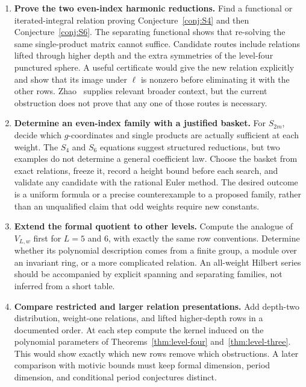 \begin{enumerate}[leftmargin=*,label=\textbf{R\arabic*.},itemsep=0.65em]

\item \textbf{Prove the two even-index harmonic reductions.}
Find a functional or iterated-integral relation proving
Conjecture~\ref{conj:S4} and then Conjecture~\ref{conj:S6}.
The separating functional shows that re-solving the same
single-product matrix cannot suffice. Candidate routes include
relations lifted through higher depth and the extra symmetries of
the level-four punctured sphere. A useful certificate would give
the new relation explicitly and show that its image under
\(\ell\) is nonzero before eliminating it with the other rows.
Zhao~\cite{Zhao} supplies relevant broader context, but the current
obstruction does not prove that any one of those routes is necessary.

\item \textbf{Determine an even-index family with a justified basket.}
For \(S_{2m}\), decide which \(g\)-coordinates and single products
are actually sufficient at each weight. The \(S_4\) and \(S_6\)
equations suggest structured reductions, but two examples do not
determine a general coefficient law. Choose the basket from exact
relations, freeze it, record a height bound before each search, and
validate any candidate with the rational Euler method.
The desired outcome is a uniform formula or a precise counterexample
to a proposed family, rather than an unqualified claim that odd
weights require new constants.

\item \textbf{Extend the formal quotient to other levels.}
Compute the analogue of \(V_{L,w}\) first for \(L=5\) and \(6\),
with exactly the same row conventions. Determine whether its
polynomial description comes from a finite group, a module over an
invariant ring, or a more complicated relation. An all-weight Hilbert
series should be accompanied by explicit spanning and separating
families, not inferred from a short table.

\item \textbf{Compare restricted and larger relation presentations.}
Add depth-two distribution, weight-one relations, and lifted
higher-depth rows in a documented order. At each step compute the
kernel induced on the polynomial parameters of
Theorems~\ref{thm:level-four} and~\ref{thm:level-three}.
This would show exactly which new rows remove which obstructions.
A later comparison with motivic bounds must keep formal dimension,
period dimension, and conditional period conjectures distinct.


\end{enumerate}
